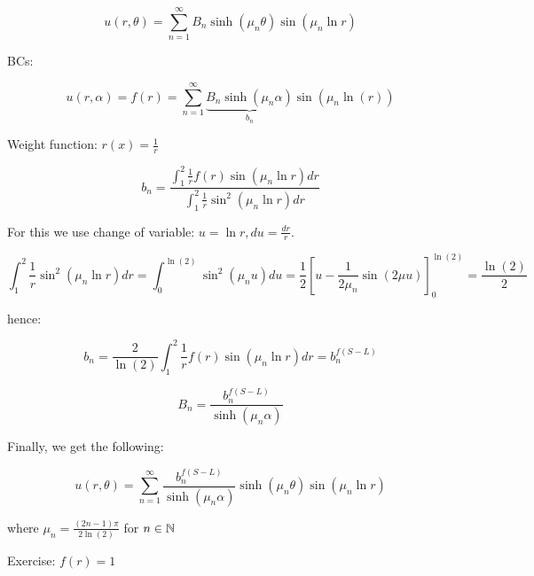 \documentclass{article}
\begin{document}
$$u(r, \theta) = \sum_{n=1}^\infty B_n \sinh (\mu_n \theta) \sin(\mu_n \ln r)$$

BCs:

$$u(r, \alpha) = f(r) = \sum_{n=1}^\infty \underbrace{B_n \sinh (\mu_n \alpha)}_{b_n} \sin (\mu_n \ln(r))$$

Weight function: $r(x) = \frac{1}{r}$

$$b_n = \frac{\int_1^2 \frac{1}{r} f(r) \sin (\mu_n \ln r) dr}{\int_1^2 \frac{1}{r} \sin^2 (\mu_n \ln r) dr}$$

For this we use change of variable: $u = \ln r, du = \frac{dr}{r}$. 

$$\int_1^2 \frac{1}{r} \sin^2 (\mu_n \ln r) dr = \int_0^{\ln(2)} \sin^2 (\mu_n u) du = \frac{1}{2} \left[ u - \frac{1}{2 \mu_n} \sin \left( 2 \mu u \right) \right]_0^{\ln(2)} = \frac{\ln(2)}{2}$$

hence:

$$b_n = \frac{2}{\ln(2)} \int_1^2 \frac{1}{r} f(r) \sin (\mu_n \ln r) dr = b_n^{f(S-L)}$$

$$B_n = \frac{b_n^{f(S-L)}}{\sinh(\mu_n \alpha)}$$

Finally, we get the following:

$$u(r, \theta) = \sum_{n=1}^\infty \frac{b_n^{f(S-L)}}{\sinh(\mu_n \alpha)} \sinh (\mu_n \theta) \sin(\mu_n \ln r)$$

where $\mu_n = \frac{(2n-1) \pi}{2 \ln(2)}$ for $n \in \mathbb{N}$

Exercise: $f(r) = 1$
\end{document}
